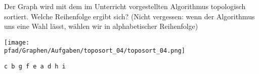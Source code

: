 \question[4]
Der Graph wird mit dem im Unterricht vorgestellten Algorithmus topologisch
sortiert. Welche Reihenfolge ergibt sich? (Nicht vergessen: wenn der Algorithmus uns
eine Wahl lässt, wählen wir in alphabetischer Reihenfolge)

\texttt{[image: \\pfad/Graphen/Aufgaben/toposort\_04/toposort\_04.png]}
\begin{solutionbox}{2cm}
\begin{lstlisting}
c b g f e a d h i
\end{lstlisting}
\end{solutionbox}
